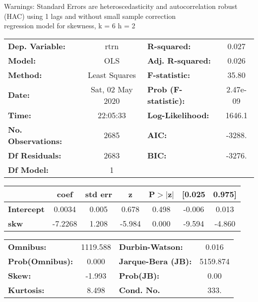 Warnings: \newline
 [1] Standard Errors are heteroscedasticity and autocorrelation robust (HAC) using 1 lags and without small sample correction\\ 

regression model for skewness, k = 6 h = 2\begin{center}
\begin{tabular}{lclc}
\toprule
\textbf{Dep. Variable:}    &       rtrn       & \textbf{  R-squared:         } &     0.027   \\
\textbf{Model:}            &       OLS        & \textbf{  Adj. R-squared:    } &     0.026   \\
\textbf{Method:}           &  Least Squares   & \textbf{  F-statistic:       } &     35.80   \\
\textbf{Date:}             & Sat, 02 May 2020 & \textbf{  Prob (F-statistic):} &  2.47e-09   \\
\textbf{Time:}             &     22:05:33     & \textbf{  Log-Likelihood:    } &    1646.1   \\
\textbf{No. Observations:} &        2685      & \textbf{  AIC:               } &    -3288.   \\
\textbf{Df Residuals:}     &        2683      & \textbf{  BIC:               } &    -3276.   \\
\textbf{Df Model:}         &           1      & \textbf{                     } &             \\
\bottomrule
\end{tabular}
\begin{tabular}{lcccccc}
                   & \textbf{coef} & \textbf{std err} & \textbf{z} & \textbf{P$> |$z$|$} & \textbf{[0.025} & \textbf{0.975]}  \\
\midrule
\textbf{Intercept} &       0.0034  &        0.005     &     0.678  &         0.498        &       -0.006    &        0.013     \\
\textbf{skw}       &      -7.2268  &        1.208     &    -5.984  &         0.000        &       -9.594    &       -4.860     \\
\bottomrule
\end{tabular}
\begin{tabular}{lclc}
\textbf{Omnibus:}       & 1119.588 & \textbf{  Durbin-Watson:     } &    0.016  \\
\textbf{Prob(Omnibus):} &   0.000  & \textbf{  Jarque-Bera (JB):  } & 5159.874  \\
\textbf{Skew:}          &  -1.993  & \textbf{  Prob(JB):          } &     0.00  \\
\textbf{Kurtosis:}      &   8.498  & \textbf{  Cond. No.          } &     333.  \\
\bottomrule
\end{tabular}
\end{center}

